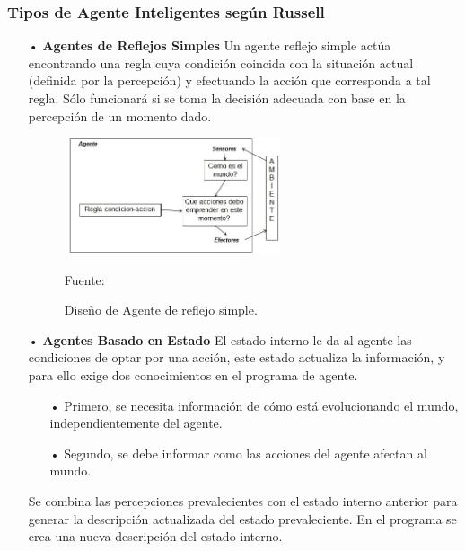 \subsubsection{Tipos de Agente Inteligentes según Russell}

\begin{itemize}
\item[•] {\bf Agentes de Reflejos Simples} \vskip 0.1cm
Un agente reflejo simple actúa encontrando una regla cuya condición coincida con la situación actual (definida por la percepción) y efectuando la acción que corresponda a tal regla. Sólo funcionará si se toma la decisión adecuada con base en la percepción de un momento dado.

\begin{figure}[ht]
\begin{center}
\includegraphics[width=0.6\textwidth]{Imagen3}
\end{center}
\begin{center}
\vskip -0.5cm
\caption{\small{Diseño de Agente de reflejo simple.}}
{\small{Fuente: \cite{FALTA}}}
\end{center}
\end{figure}

\vskip 1cm

\item[•] {\bf Agentes Basado en Estado} \vskip 0.1cm
El estado interno le da al agente las condiciones de optar por una acción, este estado actualiza la información, y para ello exige dos conocimientos en el programa de agente.
\begin{itemize}
\item[•] Primero, se necesita información de cómo está evolucionando el mundo, independientemente del agente. \vskip 0.1cm
\item[•] Segundo, se debe informar como las acciones del agente afectan al mundo.
\end{itemize}

Se combina las percepciones prevalecientes con el estado interno anterior para generar la descripción actualizada del estado prevaleciente. En el programa se crea una nueva descripción del estado interno.


\end{itemize}
